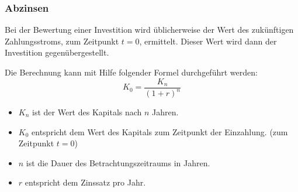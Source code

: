 \documentclass[a4paper,12pt]{article}
\begin{document}
	\subsubsection{Abzinsen}
	Bei der Bewertung einer Investition wird üblicherweise der Wert des zukünftigen Zahlungsstroms, zum Zeitpunkt $t=0$, ermittelt. Dieser Wert wird dann der Investition gegenübergestellt.\\ \par
	Die Berechnung kann mit Hilfe folgender Formel durchgeführt werden:
	\begin{equation}
	K_0=\frac{K_n}{(1+r)^n}
	\end{equation}
	\begin{itemize}
		\item $K_n$ ist der Wert des Kapitals nach $n$ Jahren.
		\item $K_0$ entspricht dem Wert des Kapitals zum Zeitpunkt der Einzahlung. (zum Zeitpunkt $t=0$)
		\item $n$ ist die Dauer des Betrachtungszeitraums in Jahren.
		\item $r$ entspricht dem Zinssatz pro Jahr.
	\end{itemize}
\end{document}
